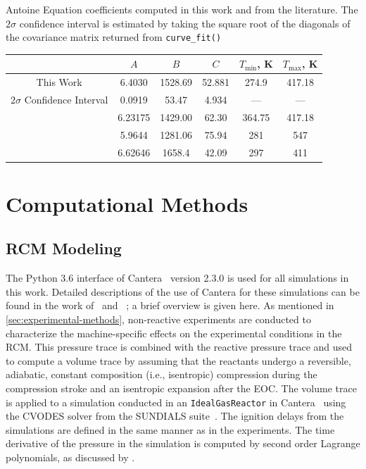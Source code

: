 \documentclass[letterpaper, review, sort&compress]{elsarticle}
\begin{document}
\begin{center}
    \captionsetup{type=table}
    \caption{Antoine Equation coefficients computed in this work and from the
    literature. The $2\sigma$ confidence interval is estimated by taking the
    square root of the diagonals of the covariance matrix returned from
    \texttt{curve\_fit()}}
    \label{tab:antoine}
    \begin{tabular}{cccccc}
        \toprule
        & $A$ & $B$ & $C$ & $T_{\text{min}}$, \si{\K} & $T_{\text{max}}$, \si{\K} \\
        \midrule
        This Work & 6.4030 & 1528.69 & 52.881 & 274.9 & 417.18 \\
        $2\sigma$ Confidence Interval & 0.0919 & 53.47 & 4.934 & --- & --- \\
        \citet{Ortega2003} & 6.23175 & 1429.00 & 62.30 & 364.75 & 417.18 \\
        \citet{Camacho2007} & 5.9644 & 1281.06 & 75.94 & 281 & 547 \\
        \citet{Stephenson1987} & 6.62646 & 1658.4 & 42.09 & 297 & 411 \\
        \bottomrule
    \end{tabular}
\end{center}

\section{Computational Methods}\label{sec:computational-methods}
\subsection{RCM Modeling}\label{sec:experimental-modeling}

The Python 3.6 interface of Cantera~\cite{cantera} version 2.3.0 is used for all simulations in this
work. Detailed descriptions of the use of Cantera for these simulations can be found in the work
of~\citet{Weber2016a} and~ \citet{Dames2016}; a brief overview is given here. As mentioned in
\cref{sec:experimental-methods}, non-reactive experiments are conducted to characterize the
machine-specific effects on the experimental conditions in the RCM. This pressure trace is combined
with the reactive pressure trace and used to compute a volume trace by assuming that the reactants
undergo a reversible, adiabatic, constant composition (i.e., isentropic) compression during the
compression stroke and an isentropic expansion after the EOC. The volume trace is applied to a
simulation conducted in an \verb|IdealGasReactor| in Cantera~\cite{cantera} using the CVODES
solver from the SUNDIALS suite~\cite{Hindmarsh2005}. The ignition delays from the simulations are
defined in the same manner as in the experiments. The time derivative of the pressure in the
simulation is computed by second order Lagrange polynomials, as discussed by \citet{Chapra2010}.
\end{document}
